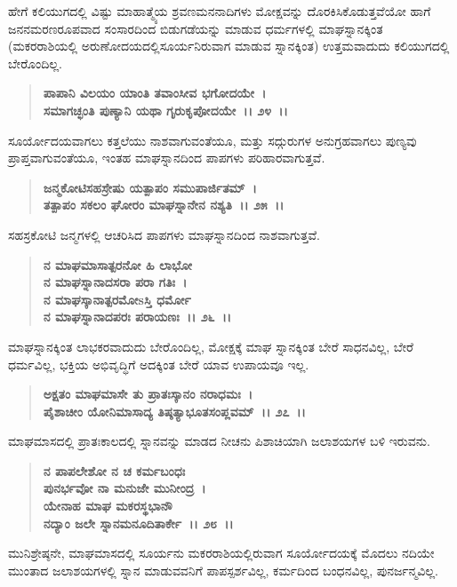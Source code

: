 ಹೇಗೆ ಕಲಿಯುಗದಲ್ಲಿ ವಿಷ್ಟು ಮಾಹಾತ್ಮ್ಯೆಯ ಶ್ರವಣಮನನಾದಿಗಳು ಮೋಕ್ಷವನ್ನು ದೊರಕಿಸಿಕೊಡುತ್ತವೆಯೋ ಹಾಗೆ ಜನನಮರಣರೂಪವಾದ ಸಂಸಾರದಿಂದ ಬಿಡುಗಡೆಯನ್ನು ಮಾಡುವ ಧರ್ಮಗಳಲ್ಲಿ ಮಾಘಸ್ನಾನಕ್ಕಿಂತ (ಮಕರರಾಶಿಯಲ್ಲಿ ಅರುಣೋದಯದಲ್ಲಿ\break ಸೂರ್ಯನಿರುವಾಗ ಮಾಡುವ ಸ್ನಾನಕ್ಕಿಂತ) ಉತ್ತಮವಾದುದು ಕಲಿಯುಗದಲ್ಲಿ ಬೇರೊಂದಿಲ್ಲ.

\begin{verse}
\textbf{ಪಾಪಾನಿ ವಿಲಯಂ ಯಾಂತಿ ತವಾಂಸೀವ ಭಗೋದಯೇ~।}\\\textbf{ಸಮಾಗಚ್ಛಂತಿ ಪುಣ್ಯಾನಿ ಯಥಾ ಗೃರುಕೃಪೋದಯೇ~।। ೨೪~।।}
\end{verse}

ಸೂರ್ಯೋದಯವಾಗಲು ಕತ್ತಲೆಯು ನಾಶವಾಗುವಂತೆಯೂ, ಮತ್ತು ಸದ್ಗುರುಗಳ ಅನುಗ್ರಹವಾಗಲು ಪುಣ್ಯವು ಪ್ರಾಪ್ತವಾಗುವಂತೆಯೂ, ಇಂತಹ ಮಾಘಸ್ನಾನದಿಂದ ಪಾಪಗಳು ಪರಿಹಾರವಾಗುತ್ತವೆ.

\begin{verse}
\textbf{ಜನ್ಮಕೋಟಿಸಹಸ್ರೇಷು ಯತ್ಪಾಪಂ ಸಮುಪಾರ್ಜಿತಮ್~।}\\\textbf{ತತ್ಪಾಪಂ ಸಕಲಂ ಘೋರಂ ಮಾಘಸ್ನಾನೇನ ನಶ್ಯತಿ~।। ೨೫~।।}
\end{verse}

ಸಹಸ್ರಕೋಟಿ ಜನ್ಮಗಳಲ್ಲಿ ಆಚರಿಸಿದ ಪಾಪಗಳು ಮಾಘಸ್ನಾನದಿಂದ ನಾಶವಾಗುತ್ತವೆ.

\begin{verse}
\textbf{ನ ಮಾಘಮಾಸಾತ್ಪರನೋ ಹಿ ಲಾಭೋ}\\\textbf{ನ ಮಾಘಸ್ನಾನಾದಸರಾ ಪರಾ ಗತಿಃ~।}\\\textbf{ನ ಮಾಘಸ್ಕಾನಾತ್ಪರಮೋsಸ್ತಿ ಧರ್ಮೋ}\\\textbf{ನ ಮಾಘಸ್ನಾನಾದಪರಃ ಪರಾಯಣಃ~।। ೨೬~।।}
\end{verse}

ಮಾಘಸ್ನಾನಕ್ಕಿಂತ ಲಾಭಕರವಾದುದು ಬೇರೊಂದಿಲ್ಲ, ಮೋಕ್ಷಕ್ಕೆ ಮಾಘ ಸ್ನಾನಕ್ಕಿಂತ ಬೇರೆ ಸಾಧನವಿಲ್ಲ, ಬೇರೆ ಧರ್ಮವಿಲ್ಲ, ಭಕ್ತಿಯ ಅಭಿವೃದ್ಧಿಗೆ ಅದಕ್ಕಿಂತ ಬೇರೆ ಯಾವ ಉಪಾಯವೂ ಇಲ್ಲ.

\begin{verse}
\textbf{ಅಕ್ಷತಂ ಮಾಘಮಾಸೇ ತು ಪ್ರಾತಃಸ್ಕಾನಂ ನರಾಧಮಃ~।}\\\textbf{ಪೈಶಾಚೀಂ ಯೋನಿಮಾಸಾದ್ಯ ತಿಷ್ಠತ್ಯಾಭೂತಸಂಪ್ಲವಮ್~।। ೨೭~।।}
\end{verse}

ಮಾಘಮಾಸದಲ್ಲಿ ಪ್ರಾತಃಕಾಲದಲ್ಲಿ ಸ್ನಾನವನ್ನು ಮಾಡದ ನೀಚನು ಪಿಶಾಚಿಯಾಗಿ ಜಲಾಶಯಗಳ ಬಳಿ ಇರುವನು.

\begin{verse}
\textbf{ನ ಪಾಪಲೇಶೋ ನ ಚ ಕರ್ಮಬಂಧಃ}\\\textbf{ಪುನರ್ಭವೋ ನಾ ಮನುಜೇ ಮುನೀಂದ್ರ~।}\\\textbf{ಯೇನಾಹ ಮಾಘ ಮಕರಸ್ಥಭಾನೌ} \\\textbf{ನದ್ಯಾಂ ಜಲೇ ಸ್ನಾನಮನೂದಿತಾರ್ಕೇ~।। ೨೮~।।}
\end{verse}

ಮುನಿಶ್ರೇಷ್ಠನೇ, ಮಾಘಮಾಸದಲ್ಲಿ ಸೂರ್ಯನು ಮಕರರಾಶಿಯಲ್ಲಿರುವಾಗ ಸೂರ್ಯೋದಯಕ್ಕೆ ಮೊದಲು ನದಿಯೇ ಮುಂತಾದ ಜಲಾಶಯಗಳಲ್ಲಿ ಸ್ನಾನ ಮಾಡುವವನಿಗೆ ಪಾಪಸ್ಪರ್ಶವಿಲ್ಲ, ಕರ್ಮದಿಂದ ಬಂಧನವಿಲ್ಲ, ಪುನರ್ಜನ್ಮವಿಲ್ಲ.

